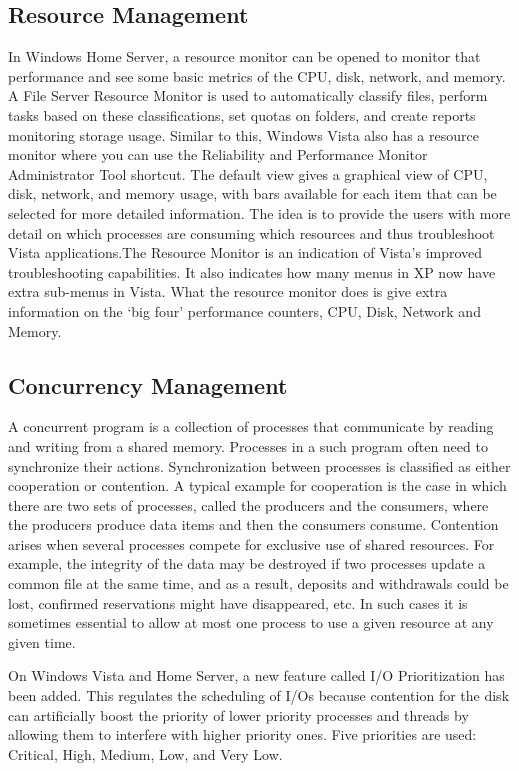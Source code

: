 \documentclass[a4paper, 12pt]{article}
\begin{document}
\subsection{Resource Management}
In Windows Home Server, a resource monitor can be opened to monitor that performance and see some basic metrics of the CPU, disk, network, and memory. A File Server Resource Monitor is used to automatically classify files, perform tasks based on these classifications, set quotas on folders, and create reports monitoring storage usage. Similar to this, Windows Vista also has a resource monitor where you can use the Reliability and Performance Monitor Administrator Tool shortcut. The default view gives a graphical view of CPU, disk, network, and memory usage, with bars available for each item that can be selected for more detailed information. The idea is to provide the users with more detail on which processes are consuming which resources and thus troubleshoot Vista applications.The Resource Monitor is an indication of Vista’s improved troubleshooting capabilities. It also indicates how many menus in XP now have extra sub-menus in Vista. What the resource monitor does is give extra information on the ‘big four’ performance counters, CPU, Disk, Network and Memory. 

\subsection{Concurrency Management}
A concurrent program is a collection of processes that communicate by reading and writing from a shared memory. Processes in a such program often need to synchronize their actions. Synchronization between processes is classified as either cooperation or contention. A typical example for
cooperation is the case in which there are two sets of processes, called the producers and the consumers, where the producers produce data items and then the consumers consume. Contention arises when several processes compete for exclusive use of shared resources. For example, the integrity of the data may be destroyed if two processes update a common file at the same time, and as a result, deposits and withdrawals could be lost, confirmed reservations might have disappeared, etc. In such cases it is sometimes essential to allow at most one process to use a given resource at any given time.

On Windows Vista and Home Server, a new feature called I/O Prioritization has been added. This regulates the scheduling of I/Os because contention for the disk can artificially boost the priority of lower priority processes and threads by allowing them to interfere with higher priority ones. Five priorities are used: Critical, High, Medium, Low, and Very Low.
\end{document}
